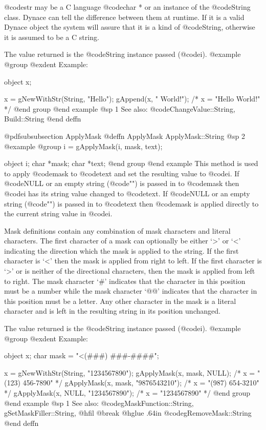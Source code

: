 @code{str} may be a C language @code{char *} or an instance of the
@code{String} class.  Dynace can tell the difference between them at
runtime.  If it is a valid Dynace object the system will assure that it is
a kind of @code{String}, otherwise it is assumed to be a C string.

The value returned is the @code{String} instance passed (@code{i}).
@example
@group
@exdent Example:

object  x;

x = gNewWithStr(String, "Hello");
gAppend(x, " World!");
/*  x = "Hello World!"  */
@end group
@end example
@sp 1
See also:  @code{ChangeValue::String, Build::String}
@end deffn












@pdfsubsubsection {ApplyMask}
@deffn {ApplyMask} ApplyMask::String
@sp 2
@example
@group
i = gApplyMask(i, mask, text);

object  i;
char    *mask;
char    *text;
@end group
@end example
This method is used to apply @code{mask} to @code{text} and set the
resulting value to @code{i}.  If @code{NULL} or an empty string
(@code{""}) is passed in to @code{mask} then @code{i} has its string
value changed to @code{text}.  If @code{NULL} or an empty string
(@code{""}) is passed in to @code{text} then @code{mask} is applied
directly to the current string value in @code{i}.

Mask definitions contain any combination of mask characters and literal
characters.  The first character of a mask can optionally be either `>'
or `<' indicating the direction which the mask is applied to the string.
If the first character is `<' then the mask is applied from right to
left.  If the first character is `>' or is neither of the directional
characters, then the mask is applied from left to right.  The mask
character `#' indicates that the character in this position must be a
number while the mask character `@@' indicates that the character in
this position must be a letter.  Any other character in the mask is a
literal character and is left in the resulting string in its position
unchanged.

The value returned is the @code{String} instance passed (@code{i}).
@example
@group
@exdent Example:

object  x;
char    mask = "<(###) ###-####";

x = gNewWithStr(String, "1234567890");
gApplyMask(x, mask, NULL);         /* x = "(123) 456-7890" */
gApplyMask(x, mask, "9876543210"); /* x = "(987) 654-3210" */
gApplyMask(x, NULL, "1234567890"); /* x = "1234567890"     */
@end group
@end example
@sp 1
See also:  @code{gMaskFunction::String, gSetMaskFiller::String,}
@hfil @break @hglue .64in      @code{gRemoveMask::String}
@end deffn















